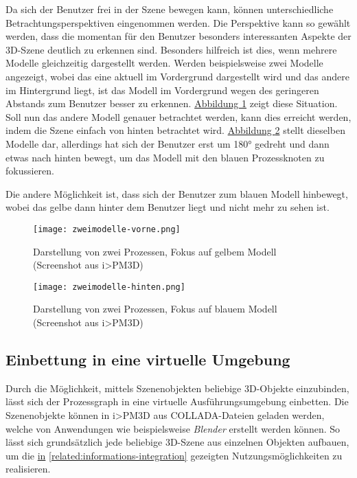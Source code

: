\documentclass[a4paper,10pt]{sphinxmanual}
\begin{document}
Da sich der Benutzer frei in der Szene bewegen kann, können unterschiedliche Betrachtungsperspektiven eingenommen werden.
Die Perspektive kann so gewählt werden, dass die momentan für den Benutzer besonders interessanten Aspekte der 3D-Szene deutlich zu erkennen sind.
Besonders hilfreich ist dies, wenn mehrere Modelle gleichzeitig dargestellt werden.
Werden beispielsweise zwei Modelle angezeigt, wobei das eine aktuell im Vordergrund dargestellt wird und das andere im Hintergrund liegt, ist das Modell im Vordergrund wegen des geringeren Abstands zum Benutzer besser zu erkennen.
\hyperref[visualisierung:zweimodelle-vorne]{Abbildung  \ref*{visualisierung:zweimodelle-vorne}} zeigt diese Situation.
Soll nun das andere Modell genauer betrachtet werden, kann dies erreicht werden, indem die Szene einfach von hinten betrachtet wird.
\hyperref[visualisierung:zweimodelle-hinten]{Abbildung  \ref*{visualisierung:zweimodelle-hinten}} stellt dieselben Modelle dar, allerdings hat sich der Benutzer erst um 180° gedreht und dann etwas nach hinten bewegt, um das Modell mit den blauen Prozessknoten zu fokussieren.

Die andere Möglichkeit ist, dass sich der Benutzer zum blauen Modell hinbewegt, wobei das gelbe dann hinter dem Benutzer liegt und nicht mehr zu sehen ist.
\begin{figure}[htbp]
\centering
\capstart

\texttt{[image: zweimodelle-vorne.png]}
\caption{Darstellung von zwei Prozessen, Fokus auf gelbem Modell (Screenshot aus i\textgreater{}PM3D)}\label{visualisierung:zweimodelle-vorne}\end{figure}
\begin{figure}[htbp]
\centering
\capstart

\texttt{[image: zweimodelle-hinten.png]}
\caption{Darstellung von zwei Prozessen, Fokus auf blauem Modell (Screenshot aus i\textgreater{}PM3D)}\label{visualisierung:zweimodelle-hinten}\end{figure}


\subsection{Einbettung in eine virtuelle Umgebung}
\label{visualisierung:einbettung-in-eine-virtuelle-umgebung}
Durch die Möglichkeit, mittels Szenenobjekten beliebige 3D-Objekte einzubinden, lässt sich der Prozessgraph in eine virtuelle Ausführungsumgebung einbetten.
Die Szenenobjekte können in i\textgreater{}PM3D aus COLLADA-Dateien geladen werden, welche von Anwendungen wie beispielsweise \emph{Blender} \cite{www:blender} erstellt werden können.
So lässt sich grundsätzlich jede beliebige 3D-Szene aus einzelnen Objekten aufbauen, um die {\hyperref[related:informations-integration]{in}} \autoref*{related:informations-integration} gezeigten Nutzungsmöglichkeiten zu realisieren.
\end{document}

